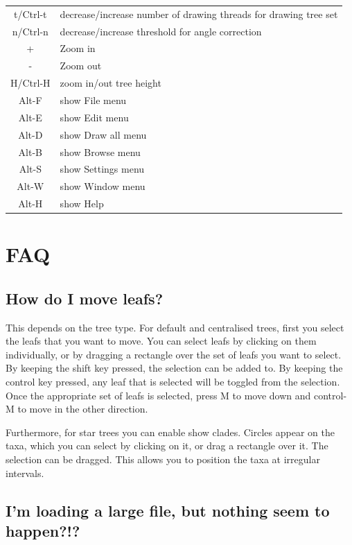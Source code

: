 \documentclass{article}
\begin{document}
\begin{center}
\begin{tabular}{|c|l|}
t/Ctrl-t &decrease/increase number of drawing threads for drawing tree set\\
n/Ctrl-n &decrease/increase threshold for angle correction\\
\hline
+ & Zoom in \\
- & Zoom out \\
H/Ctrl-H &zoom in/out tree height\\
\hline
Alt-F & show File menu\\
Alt-E & show Edit menu\\
Alt-D & show Draw all menu\\
Alt-B & show Browse menu\\
Alt-S & show Settings menu\\
Alt-W & show Window menu\\
Alt-H & show Help\\
\hline
\end{tabular}
\end{center}
\fi

\newpage
\section{FAQ\label{sec.faq}}

\subsection{How do I move leafs?}

This depends on the tree type. For default and centralised trees, first you select the leafs that you want to move.
You can select leafs by clicking on them individually, or by dragging a rectangle
over the set of leafs you want to select. By keeping the shift key pressed, the
selection can be added to. By keeping the control key pressed, any leaf that is
selected will be toggled from the selection. Once the appropriate set of leafs
is selected, press M to move down and control-M to move in the other direction.

Furthermore, for star trees you can enable show clades. Circles appear on the taxa,
which you can select by clicking on it, or drag a rectangle over it. The selection
can be dragged. This allows you to position the taxa at irregular intervals.


\subsection{I'm loading a large file, but nothing seem to happen?!?}
\end{document}
